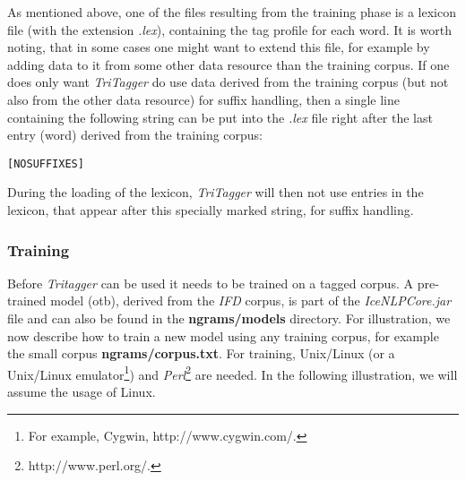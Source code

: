 \documentclass[11pt]{article}
\begin{document}
As mentioned above, one of the files resulting from the training phase is a lexicon file (with the extension \textit{.lex}), containing the tag profile for each word.
It is worth noting, that in some cases one might want to extend this file, for example by adding data to it from some other data resource than the training corpus.
If one does only want \textit{TriTagger} do use data derived from the training corpus (but not also from the other data resource) for suffix handling, then a single line containing the following string can be put into the \textit{.lex} file right after the last entry (word) derived from the training corpus:
\begin{verbatim}
[NOSUFFIXES] 
\end{verbatim}
During the loading of the lexicon, \textit{TriTagger} will then not use entries in the lexicon, that appear after this specially marked string, for suffix handling.

\subsubsection{Training}
\label{sec:train}
Before \emph{Tritagger} can be used it needs to be trained on a tagged corpus.
A pre-trained model (otb), derived from the \emph{IFD} corpus, is part of the \emph{IceNLPCore.jar} file and can also be found in the {\bf ngrams/models} directory.
For illustration, we now describe how to train a new model using any training corpus, for example the small corpus \textbf{ngrams/corpus.txt}.
For training, Unix/Linux (or a Unix/Linux emulator\footnote{For example, Cygwin, http://www.cygwin.com/.}) and \emph{Perl}\footnote{http://www.perl.org/.} are needed.
In the following illustration, we will assume the usage of Linux.
\end{document}
